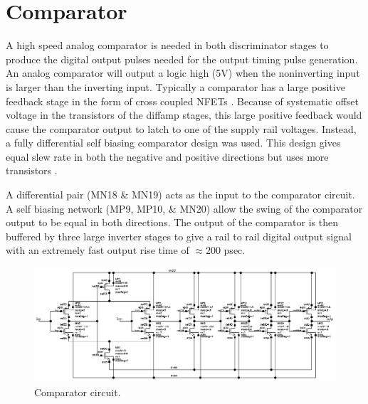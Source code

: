 \documentclass[12pt,oneside,final]{siuethesis}
\theoremstyle{definition}
\begin{document}
\section{Comparator}
\par A high speed analog comparator is needed in both discriminator stages to produce the digital output pulses needed for the output timing pulse generation. An analog comparator will output a logic high (5V) when the noninverting input is larger than the inverting input.  Typically a comparator has a large positive feedback stage in the form of cross coupled NFETs \cite{BAKER}. Because of systematic offset voltage in the transistors of the diffamp stages, this large positive feedback would cause the comparator output to latch to one of the supply rail voltages. Instead, a fully differential self biasing comparator design was used. This design gives equal slew rate in both the negative and positive directions but uses more transistors \cite{ALLEN-HOLBERG}. 
\par A differential pair (MN18 \& MN19) acts as the input to the comparator circuit. A self biasing network (MP9, MP10, \& MN20) allow the swing of the comparator output to be equal in both directions. The output of the comparator is then buffered by three large inverter stages to give a rail to rail digital output signal with an extremely fast output rise time of $\approx 200$ psec. 
\begin{figure}[htbp!]
\centering
\includegraphics[scale=.55,keepaspectratio=true]{images/comp.png} 
\caption{Comparator circuit.}
\label{fig:comp}
\end{figure}
\end{document}
